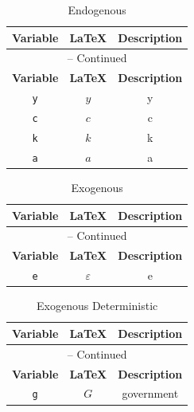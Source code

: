 \begin{center}
\begin{longtable}{ccc}
\caption{Endogenous}\\%
\hline%
\multicolumn{1}{c}{\textbf{Variable}} &
\multicolumn{1}{c}{\textbf{\LaTeX}} &
\multicolumn{1}{c}{\textbf{Description}}\\%
\hline\hline%
\endfirsthead
\multicolumn{3}{c}{{\tablename} \thetable{} -- Continued}\\%
\hline%
\multicolumn{1}{c}{\textbf{Variable}} &
\multicolumn{1}{c}{\textbf{\LaTeX}} &
\multicolumn{1}{c}{\textbf{Description}}\\%
\hline\hline%
\endhead
\texttt{y} & $y$ & y\\
\texttt{c} & $c$ & c\\
\texttt{k} & $k$ & k\\
\texttt{a} & $a$ & a\\
\hline%
\end{longtable}
\end{center}
\begin{center}
\begin{longtable}{ccc}
\caption{Exogenous}\\%
\hline%
\multicolumn{1}{c}{\textbf{Variable}} &
\multicolumn{1}{c}{\textbf{\LaTeX}} &
\multicolumn{1}{c}{\textbf{Description}}\\%
\hline\hline%
\endfirsthead
\multicolumn{3}{c}{{\tablename} \thetable{} -- Continued}\\%
\hline%
\multicolumn{1}{c}{\textbf{Variable}} &
\multicolumn{1}{c}{\textbf{\LaTeX}} &
\multicolumn{1}{c}{\textbf{Description}}\\%
\hline\hline%
\endhead
\texttt{e} & $\varepsilon$ & e\\
\hline%
\end{longtable}
\end{center}
\begin{center}
\begin{longtable}{ccc}
\caption{Exogenous Deterministic}\\%
\hline%
\multicolumn{1}{c}{\textbf{Variable}} &
\multicolumn{1}{c}{\textbf{\LaTeX}} &
\multicolumn{1}{c}{\textbf{Description}}\\%
\hline\hline%
\endfirsthead
\multicolumn{3}{c}{{\tablename} \thetable{} -- Continued}\\%
\hline%
\multicolumn{1}{c}{\textbf{Variable}} &
\multicolumn{1}{c}{\textbf{\LaTeX}} &
\multicolumn{1}{c}{\textbf{Description}}\\%
\hline\hline%
\endhead
\texttt{g} & $G$ & government\\
\hline%
\end{longtable}
\end{center}
